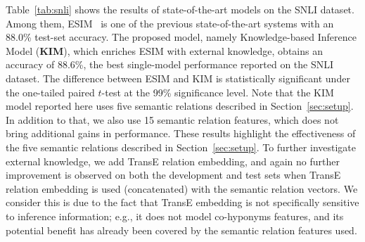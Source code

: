 \documentclass[11pt,a4paper]{article}
\begin{document}
Table~\ref{tab:snli} shows the results of state-of-the-art models on the SNLI dataset. 
Among them, ESIM~\citep{DBLP:conf/acl/ChenZLWJI17} is one of the previous state-of-the-art systems with an 88.0\% test-set accuracy. The proposed model, namely Knowledge-based Inference Model (\textbf{KIM}), which enriches ESIM with external knowledge, obtains an accuracy of 88.6\%, the best single-model performance reported on the SNLI dataset. The difference between ESIM and KIM is statistically significant under the one-tailed paired $t$-test at the 99\% significance level. Note that the KIM model reported here uses five semantic relations described in Section~\ref{sec:setup}. In addition to that, we also use 15 semantic relation features, which does not bring additional gains in performance. These results highlight the effectiveness of the five semantic relations described in Section~\ref{sec:setup}. To further investigate external knowledge, we add TransE relation embedding, and again no further improvement is observed on both the development and test sets when TransE relation embedding is used (concatenated) with the semantic relation vectors. We consider this is due to the fact that TransE embedding is not specifically sensitive to inference information; e.g., it does not model co-hyponyms features, and its potential benefit has already been covered by the semantic relation features used.   
\end{document}

